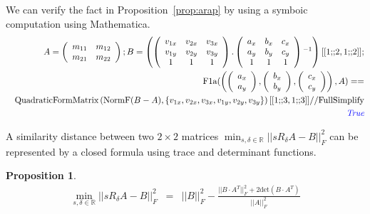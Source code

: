 \documentclass[8pt]{article}
\newtheorem{prop}{\bf Proposition}
\begin{document}
\begin{screen}
We can verify the fact in Proposition~\ref{prop:arap}
by using a symboic computation using Mathematica.
\begin{eqnarray*}
&&A=\left(
\begin{array}{cc}
 m_{11} & m_{12} \\
 m_{21} & m_{22} \\
\end{array}
\right);B=\left(\left(
\begin{array}{ccc}
 v_{1 x} & v_{2 x} & v_{3 x} \\
 v_{1 y} & v_{2 y} & v_{3 y} \\
 1 & 1 & 1 \\
\end{array}
\right).\left(
\begin{array}{ccc}
 a_x & b_x & c_x \\
 a_y & b_y & c_y \\
 1 & 1 & 1 \\
\end{array}
\right){}^{-1}\right)[[1\text{;;}2,1\text{;;}2]]; \\
&& 
\text{F1a}(
\left(
\left( \begin{array}{c} a_{x} \\ a_{y} \end{array} \right),
\left( \begin{array}{c} b_{x} \\ b_{y} \end{array} \right),
\left( \begin{array}{c} c_{x} \\ c_{y} \end{array} \right)
\right), A
) == \\
&&
 \text{QuadraticFormMatrix}\left(\text{NormF}(B-A),
			    \left\{v_{1 x},v_{2 x},v_{3 x},v_{1 y},v_{2 y},v_{3 y}
			    \right\}\right)[[1\text{;;}3,1\text{;;}3]]
 //
 \text{FullSimplify}\\
 && \text{\it \color{blue}True}
\end{eqnarray*}
\end{screen}

A similarity distance between two $2\times 2$ matrices
$\min_{s,\delta \in \mathbb{R}}||sR_\delta A - B||_F^2$
can be represented by a closed formula
using trace and determinant functions.

\begin{prop}
{\bf \cite{Kaji2012}} \label{propsim}
\begin{eqnarray*}
\min_{s,\delta \in \mathbb{R}}||sR_\delta A - B||_F^2 &=& ||B||^2_F - \frac{||B \cdot A^T||_F^2 + 2 \mathrm {det}(B \cdot A^T)}{||A||^2_F}
\end{eqnarray*}
\end{prop}
\end{document}
